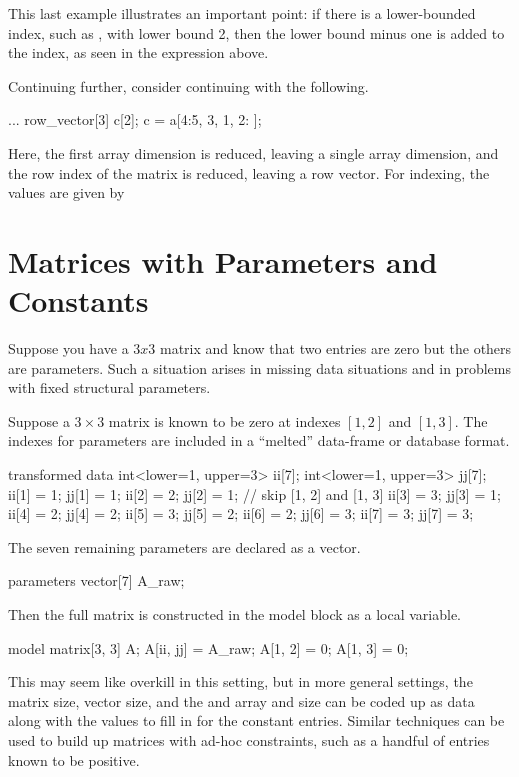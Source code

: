 This last example illustrates an important point: if there is a
lower-bounded index, such as , with lower bound 2, then the
lower bound minus one is added to the index, as seen in the  expression above.

Continuing further, consider continuing with the following.
%
\begin{stancode}
...
row_vector[3] c[2];
c = a[4:5, 3, 1, 2: ];
\end{stancode}
%
Here, the first array dimension is reduced, leaving a single array
dimension, and the row index of the matrix is reduced, leaving a row
vector.  For indexing, the values are given by


\section{Matrices with Parameters and Constants}

Suppose you have a $3 x 3$ matrix and know that two entries are zero but the
others are parameters.  Such a situation arises in missing data
situations and in problems with fixed structural parameters.

Suppose a $3 \times 3$ matrix is known to be zero at indexes $[1,2]$
and $[1,3]$.  The indexes for parameters are included in a ``melted''
data-frame or database format.

\begin{stancode}
transformed data {
  int<lower=1, upper=3> ii[7];
  int<lower=1, upper=3> jj[7];
  ii[1] = 1;  jj[1] = 1;
  ii[2] = 2;  jj[2] = 1;   // skip [1, 2] and [1, 3]
  ii[3] = 3;  jj[3] = 1;
  ii[4] = 2;  jj[4] = 2;
  ii[5] = 3;  jj[5] = 2;
  ii[6] = 2;  jj[6] = 3;
  ii[7] = 3;  jj[7] = 3;
}
\end{stancode}
%
The seven remaining parameters are declared as a vector.
%
\begin{stancode}
parameters {
  vector[7] A_raw;
}
\end{stancode}
%
Then the full matrix  is constructed in the model block as a
local variable.
%
\begin{stancode}
model {
  matrix[3, 3] A;
  A[ii, jj] = A_raw;
  A[1, 2] = 0;
  A[1, 3] = 0;
}
\end{stancode}

This may seem like overkill in this setting, but in more general
settings, the matrix size, vector size, and the  and
 array and size can be coded up as data along with the values
to fill in for the constant entries.  Similar techniques can be used
to build up matrices with ad-hoc constraints, such as a handful of
entries known to be positive.


